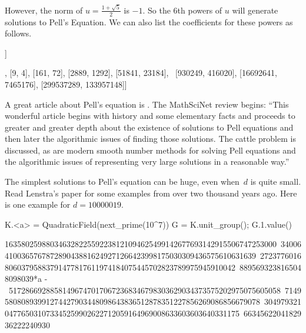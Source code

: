 However, the norm of $u = \frac{1+\sqrt{5}}{2}$ is $-1$.
So the $6$th powers of $u$ will generate solutions to Pell's Equation.
We can also list the coefficients for these powers as follows.

\begin{sagecode} %
\begin{sagecell}
[list(u^(6*i)) for i in [0..7]]
\end{sagecell}
\begin{sageout}
[[1, 0], [9, 4], [161, 72], [2889, 1292], [51841, 23184], \
[930249, 416020], [16692641, 7465176], [299537289, 133957148]]
\end{sageout}
\end{sagecode}

\begin{remark}
	A great article about Pell's equation is \cite{lenstra:pell}.  The
	MathSciNet review begins: ``This wonderful article begins with history
	and some elementary facts and proceeds to greater and greater depth
	about the existence of solutions to Pell equations and then later the
	algorithmic issues of finding those solutions. The cattle problem is
	discussed, as are modern smooth number methods for solving Pell
	equations and the algorithmic issues of representing very large
	solutions in a reasonable way.''
\end{remark}

The simplest solutions to Pell's equation can be huge, even when~$d$
is quite small.  Read Lenstra's paper for some examples from
over two thousand years ago.  Here is one example for $d=10000019$.

\begin{sagecode}
\begin{sagecell}
K.<a> = QuadraticField(next_prime(10^7))
G = K.unit_group(); G.1.value()
\end{sagecell}
\begin{sageout}
163580259880346328225592238121094625499142677693142915506747253000\
340064100365767872890438816249271266423998175030309436575610631639\
272377601680603795883791477817611974184075445702823789975945910042\
8895693238165048098039*a - \
517286692885814967470170672368346798303629034373575202975075605058\
714958080893991274427903448098643836512878351227856269086856679078\
304979321047765031073345259902622712059164969008633603603640331175\
6634562204182936222240930
\end{sageout}
\end{sagecode}

